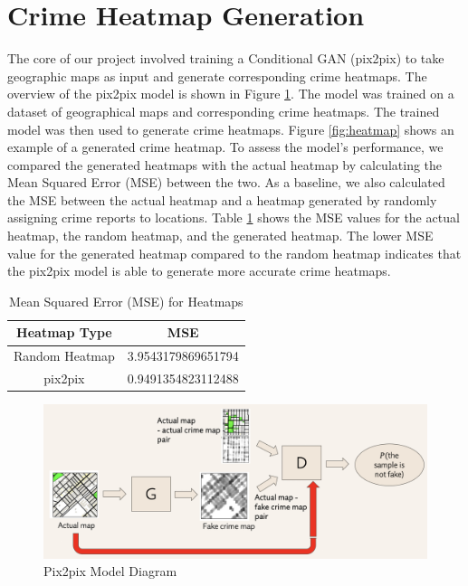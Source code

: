 \documentclass{article}
\begin{document}
\section{Crime Heatmap Generation}

The core of our project involved training a Conditional GAN (pix2pix) to take geographic maps as input and generate corresponding crime heatmaps. The overview of the pix2pix model is shown in Figure \ref{fig:pix2pix}. The model was trained on a dataset of geographical maps and corresponding crime heatmaps. The trained model was then used to generate crime heatmaps. Figure \ref{fig:heatmap} shows an example of a generated crime heatmap. To assess the model's performance, we compared the generated heatmaps with the actual heatmap by calculating the Mean Squared Error (MSE) between the two. As a baseline, we also calculated the MSE between the actual heatmap and a heatmap generated by randomly assigning crime reports to locations. Table \ref{tab:mse} shows the MSE values for the actual heatmap, the random heatmap, and the generated heatmap. The lower MSE value for the generated heatmap compared to the random heatmap indicates that the pix2pix model is able to generate more accurate crime heatmaps.

\begin{table}[!htbp]
    \centering
    \begin{tabular}{|c|c|}
        \hline
        \textbf{Heatmap Type} & \textbf{MSE}       \\
        \hline
        Random Heatmap        & 3.9543179869651794 \\
        pix2pix               & 0.9491354823112488 \\
        \hline
    \end{tabular}
    \caption{Mean Squared Error (MSE) for Heatmaps}
    \label{tab:mse}
\end{table}

\begin{figure}[!htbp]
    \centering
    \includegraphics[width=1\textwidth]{Figures/conditionalgan.png}
    \caption{Pix2pix Model Diagram}
    \label{fig:pix2pix}
\end{figure}
\end{document}
